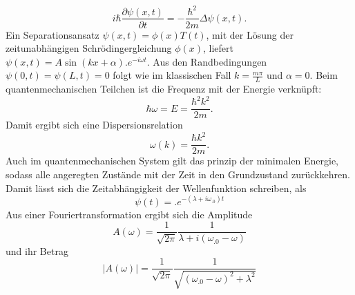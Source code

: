\[
i\hbar\frac{\partial\psi(x,t)}{\partial t}=-\frac{\hbar^2}{2m}\Delta\psi(x,t)\text{.}
\]
Ein Separationsansatz $\psi(x,t)=\phi(x)T(t)$, mit der Lösung der zeitunabhängigen Schrödingergleichung $\phi(x)$, liefert
$\psi(x,t)=A\sin(kx+\alpha) .e^{-i\omega t}$. Aus den Randbedingungen 
$\psi(0,t)=\psi(L,t)=0$ folgt wie im klassischen Fall $k=\frac{m\pi}{L}$ und $\alpha=0$.
Beim quantenmechanischen Teilchen ist die Frequenz mit der Energie verknüpft:
\[
\hbar\omega=E=\frac{\hbar^2k^2}{2m}\text{.}
\]
Damit ergibt sich eine Dispersionsrelation
\begin{equation}
\omega(k)=\frac{\hbar k^2}{2m}\text{.}\label{eq:omega_q}
\end{equation}
Auch im quantenmechanischen System gilt das prinzip der minimalen Energie, sodass alle angeregten Zustände mit der Zeit in den Grundzustand zurückkehren. Damit lässt sich die Zeitabhängigkeit der Wellenfunktion schreiben, als
\[
\psi(t)=.e^{-(\lambda+i\omega_.0)t}
\]
Aus einer Fouriertransformation ergibt sich die Amplitude
\[
A(\omega)=\frac{1}{\sqrt{2\pi}}\frac{1}{\lambda+i(\omega_.0-\omega)}
\]
und ihr Betrag
\begin{equation}
|A(\omega)|=\frac{1}{\sqrt{2\pi}}\frac{1}{\sqrt{(\omega_.0-\omega)^2+\lambda^2}}
\end{equation}
